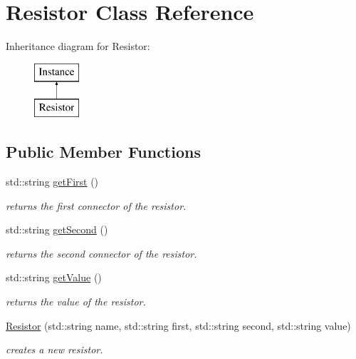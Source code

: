 \hypertarget{class_s_p_i_c_e_1_1_resistor}{}\section{Resistor Class Reference}
\label{class_s_p_i_c_e_1_1_resistor}
Inheritance diagram for Resistor\+:\begin{figure}[H]
\begin{center}
\leavevmode
\includegraphics[height=2.000000cm]{class_s_p_i_c_e_1_1_resistor}
\end{center}
\end{figure}
\subsection*{Public Member Functions}
\begin{DoxyCompactItemize}
\item 
\mbox{\label{class_s_p_i_c_e_1_1_resistor_ab57aa52f48a5a56c89dd49eae66c1a0f}} 
std\+::string \mbox{\hyperlink{class_s_p_i_c_e_1_1_resistor_ab57aa52f48a5a56c89dd49eae66c1a0f}{get\+First}} ()
\begin{DoxyCompactList}\small\item\em returns the first connector of the resistor. \end{DoxyCompactList}\item 
\mbox{\label{class_s_p_i_c_e_1_1_resistor_a9665313821b2fca41e14b9865133af7f}} 
std\+::string \mbox{\hyperlink{class_s_p_i_c_e_1_1_resistor_a9665313821b2fca41e14b9865133af7f}{get\+Second}} ()
\begin{DoxyCompactList}\small\item\em returns the second connector of the resistor. \end{DoxyCompactList}\item 
\mbox{\label{class_s_p_i_c_e_1_1_resistor_a4c052cb2622c580a250b2c783a436882}} 
std\+::string \mbox{\hyperlink{class_s_p_i_c_e_1_1_resistor_a4c052cb2622c580a250b2c783a436882}{get\+Value}} ()
\begin{DoxyCompactList}\small\item\em returns the value of the resistor. \end{DoxyCompactList}\item 
\mbox{\hyperlink{class_s_p_i_c_e_1_1_resistor_aa4e89fab1189113134e98edbb0c622bf}{Resistor}} (std\+::string name, std\+::string first, std\+::string second, std\+::string value)
\begin{DoxyCompactList}\small\item\em creates a new resistor. \end{DoxyCompactList}\end{DoxyCompactItemize}


